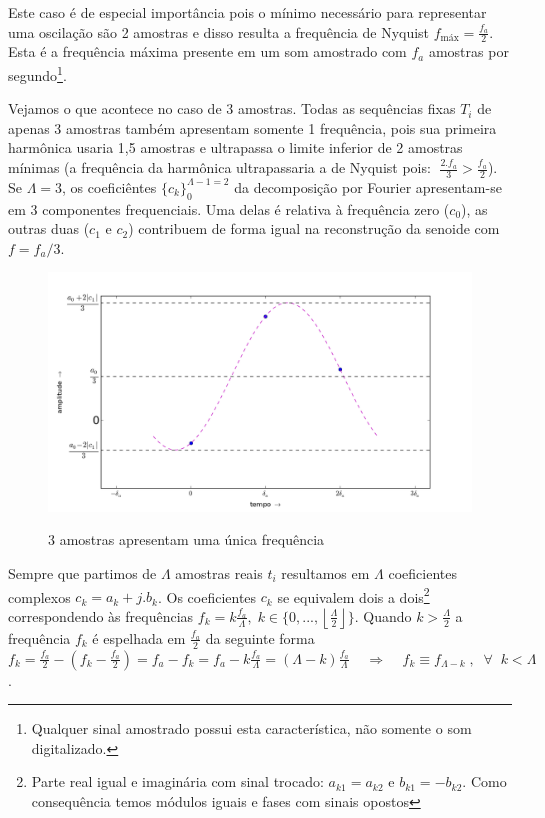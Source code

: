 Este caso é de especial importância pois o mínimo necessário para representar uma oscilação são 2 amostras e disso resulta a frequência de Nyquist $f_{\text{máx}}=\frac{f_a}{2}$. Esta é a frequência máxima presente em um som amostrado com $f_a$ amostras por segundo\footnote{Qualquer sinal amostrado possui esta característica, não somente o som digitalizado.}.

Vejamos o que acontece no caso de 3 amostras. Todas as sequências fixas $T_i$ de apenas 3 amostras também apresentam
somente 1 frequência, pois sua primeira harmônica usaria 1,5 amostras e ultrapassa o limite inferior de 2 amostras mínimas (a frequência da harmônica ultrapassaria a de Nyquist pois:  $\; \frac{2. f_a}{3} > \frac{f_a}{2} $). Se $\Lambda=3$, 
os coeficiêntes $\{c_k\}_0^{\Lambda-1=2}$ da decomposição por Fourier apresentam-se em 
3 componentes frequenciais. Uma delas é relativa à frequência zero ($c_0$), as outras duas ($c_1$ e $c_2$) contribuem de forma igual na reconstrução da senoide com $f=f_a/3$.

\begin{figure}[h!]
    \centering
    \caption{3 amostras apresentam uma única frequência}
        \includegraphics[width=\textwidth]{figuras/amostras3b}
        \label{fig:amostras3}
\end{figure}



Sempre que partimos de $\Lambda$ amostras reais $t_i$ resultamos em $\Lambda$ coeficientes complexos $c_k=a_k+j.b_k$. Os coeficientes $c_k$ se equivalem dois a dois\footnote{Parte real igual e imaginária com sinal trocado: $a_{k1}=a_{k2}$ e $b_{k1}=-b_{k2}$. Como consequência temos módulos iguais e fases com sinais opostos} correspondendo às frequências $f_k = k\frac{f_a}{\Lambda}, \; k \in \{0, ..., \left \lfloor \frac{\Lambda}{2} \right \rfloor \} $.
Quando $k> \frac{\Lambda}{2} $
a frequência $f_k$ é espelhada em $\frac{f_a}{2}$ da seguinte forma $f_k=\frac{f_a}{2} - (f_k-\frac{f_a}{2})=f_a-f_k=f_a - k\frac{f_a}{\Lambda}=(\Lambda-k)\frac{f_a}{\Lambda} \;\;\;\; \Rightarrow \;\;\;\; f_k\equiv f_{\Lambda-k} \; ,\;\; \forall \;\; k<\Lambda$. 

